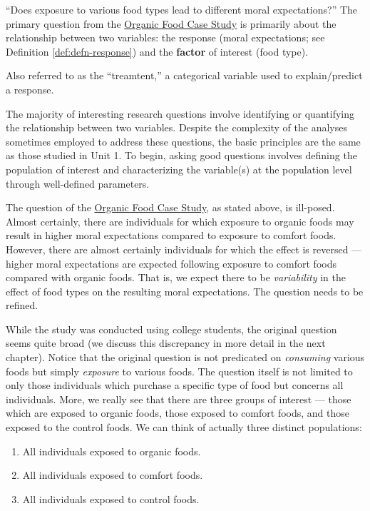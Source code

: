 \documentclass[]{book}
\providecommand{\tightlist}{%
  \setlength{\itemsep}{0pt}\setlength{\parskip}{0pt}}
\theoremstyle{definition}
\theoremstyle{definition}
\theoremstyle{remark}
\let\BeginKnitrBlock\begin \let\EndKnitrBlock\end
\begin{document}
``Does exposure to various food types lead to different moral
expectations?'' The primary question from the
\protect\hyperlink{CaseOrganic}{Organic Food Case Study} is primarily
about the relationship between two variables: the response (moral
expectations; see Definition \ref{def:defn-response}) and the
\textbf{factor} of interest (food type).

\BeginKnitrBlock{definition}[Factor]
\protect\hypertarget{def:defn-factor}{}{\label{def:defn-factor}
{} }Also referred to as the ``treamtent,'' a
categorical variable used to explain/predict a response.
\EndKnitrBlock{definition}

The majority of interesting research questions involve identifying or
quantifying the relationship between two variables. Despite the
complexity of the analyses sometimes employed to address these
questions, the basic principles are the same as those studied in Unit 1.
To begin, asking good questions involves defining the population of
interest and characterizing the variable(s) at the population level
through well-defined parameters.

The question of the \protect\hyperlink{CaseOrganic}{Organic Food Case
Study}, as stated above, is ill-posed. Almost certainly, there are
individuals for which exposure to organic foods may result in higher
moral expectations compared to exposure to comfort foods. However, there
are almost certainly individuals for which the effect is reversed ---
higher moral expectations are expected following exposure to comfort
foods compared with organic foods. That is, we expect there to be
\emph{variability} in the effect of food types on the resulting moral
expectations. The question needs to be refined.

While the study was conducted using college students, the original
question seems quite broad (we discuss this discrepancy in more detail
in the next chapter). Notice that the original question is not
predicated on \emph{consuming} various foods but simply \emph{exposure}
to various foods. The question itself is not limited to only those
individuals which purchase a specific type of food but concerns all
individuals. More, we really see that there are three groups of interest
--- those which are exposed to organic foods, those exposed to comfort
foods, and those exposed to the control foods. We can think of actually
three distinct populations:

\begin{enumerate}
\def\labelenumi{\arabic{enumi}.}
\tightlist
\item
  All individuals exposed to organic foods.
\item
  All individuals exposed to comfort foods.
\item
  All individuals exposed to control foods.
\end{enumerate}
\end{document}
